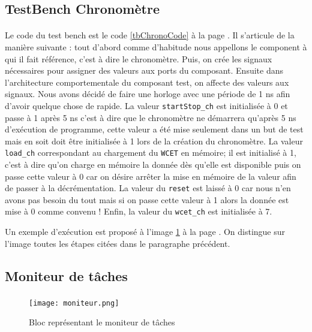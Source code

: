 \documentclass[a4paper,12pt]{report}
\begin{document}
			
		\subsection{TestBench Chronomètre}
			\paragraph*{}
			Le code du test bench est le code \ref{tbChronoCode} à la page \pageref{tbChronoCode}. Il s'articule de la manière suivante : tout d'abord comme d'habitude nous appellons le component à qui il fait référence, c'est à dire le chronomètre. Puis, on crée les signaux nécessaires pour assigner des valeurs aux ports du composant. Ensuite dans l'architecture comportementale du composant test, on affecte des valeurs aux signaux. Nous avons décidé de faire une horloge avec une période de 1 ns afin d'avoir quelque chose de rapide. La valeur \texttt{startStop\_ch} est initialisée à 0 et passe à 1 après 5 ns c'est à dire que le chronomètre ne démarrera qu'après 5 ns d'exécution de programme, cette valeur a été mise seulement dans un but de test mais en soit doit être initialisée à 1 lors de la création du chronomètre. La valeur \texttt{load\_ch} correspondant au chargement du \texttt{WCET} en mémoire; il est initialisé à 1, c'est à dire qu'on charge en mémoire la donnée dès qu'elle est disponible puis on passe cette valeur à 0 car on désire arrêter la mise en mémoire de la valeur afin de passer à la décrémentation. La valeur du \texttt{reset} est laissé à 0 car nous n'en avons pas besoin du tout mais si on passe cette valeur à 1 alors la donnée est mise à 0 comme convenu ! Enfin, la valeur du \texttt{wcet\_ch} est initialisée à 7.
			
			Un exemple d'exécution est proposé à l'image \ref{chronoTB} à la page \pageref{chronoTB}. On distingue sur l'image toutes les étapes citées dans le paragraphe précédent.
			
		\subsection{Moniteur de tâches}
			\paragraph*{}
			
			
			\begin{figure}[H]
				\centering
					\texttt{[image: moniteur.png]}
					\caption{Bloc représentant le moniteur de tâches}
				\label{chronoTB}
			\end{figure}
	
\end{document}
